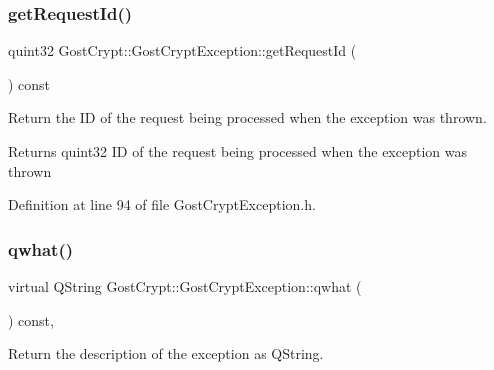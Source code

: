 \mbox{\label{class_gost_crypt_1_1_gost_crypt_exception_a11db61bc33270cb1f19b0d686fadb055}} 
\subsubsection{\texorpdfstring{get\+Request\+Id()}{getRequestId()}}
{\footnotesize\ttfamily quint32 Gost\+Crypt\+::\+Gost\+Crypt\+Exception\+::get\+Request\+Id (\begin{DoxyParamCaption}{ }\end{DoxyParamCaption}) const\hspace{0.3cm}{\ttfamily [inline]}}



Return the ID of the request being processed when the exception was thrown. 

\begin{DoxyReturn}{Returns}
quint32 ID of the request being processed when the exception was thrown 
\end{DoxyReturn}


Definition at line 94 of file Gost\+Crypt\+Exception.\+h.

\mbox{\label{class_gost_crypt_1_1_gost_crypt_exception_a99e923110f90c9b7af990d3bfe97f164}} 
\subsubsection{\texorpdfstring{qwhat()}{qwhat()}}
{\footnotesize\ttfamily virtual Q\+String Gost\+Crypt\+::\+Gost\+Crypt\+Exception\+::qwhat (\begin{DoxyParamCaption}{ }\end{DoxyParamCaption}) const\hspace{0.3cm}{\ttfamily [inline]}, {\ttfamily [virtual]}}



Return the description of the exception as Q\+String. 

